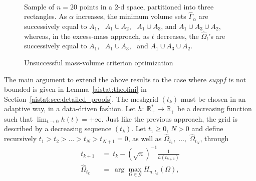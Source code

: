 \begin{center}
\begin{figure}[h!]
\centering
{}
\caption{Unsuccessful mass-volume criterion optimization}
\parbox{13cm}{~\\ \footnotesize Sample of $n=20$ points in a $2$-d space, partitioned into three rectangles.  As $\alpha$ increases, the minimum volume sets $\hat \Gamma_{\alpha}$ are successively equal to $A_1$,~ $A_1 \cup A_2$,~ $A_1 \cup A_3$, and $A_1 \cup A_3 \cup A_2$, whereas, in the excess-mass approach, as $t$ decreases, the $\hat \Omega_{t}$'s are successively equal to $A_1$,~ $A_1 \cup A_3$,~ and $A_1 \cup A_3 \cup A_2$.
}
\label{aistat:algo-problem}
\end{figure}
\end{center}


The main argument to extend the above results to the case where $supp f$ is not bounded is given in Lemma~\ref{aistat:theofini} in Section~\ref{aistat:sec:detailed_proofs}. The meshgrid $(t_k)$ must be chosen in an adaptive way, in a data-driven fashion.  Let $h:~\mathbb{R}_+^* \rightarrow \mathbb{R}_+$ be a decreasing function such that $ \lim_{t \rightarrow 0}h(t)=+\infty$. Just like the previous approach, the grid is described by a decreasing sequence $(t_k)$. Let $t_1 \ge 0$, $N>0$ and define recursively $t_1>t_{2}>\ldots>t_{N}>t_{N+1}=0$, as well as $\hat \Omega_{t_1},\; \ldots,\;\hat \Omega_{t_N}$, through
\noindent
\begin{align}
\label{aistat:tk-omegak}t_{k+1}&~=~t_k -(\sqrt n)^{-1}\frac{1}{h(t_{k+1})}  \\ 
\label{aistat:tk1} \hat{\Omega}_{t_k}&~=~\arg\max_{\Omega \in \mathcal{G}} H_{n,t_k}(\Omega),
\end{align}

